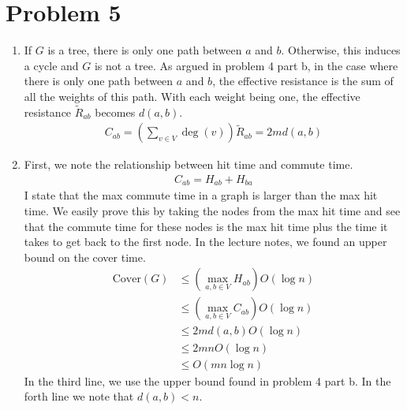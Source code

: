 \documentclass[12pt,a4paper]{article}
\begin{document}
	\section*{Problem 5}
	\begin{enumerate}[label=\alph*.]
		\item If $G$ is a tree, there is only one path between $a$ and $b$. Otherwise, this induces a cycle and $G$ is not a tree. As argued in problem 4 part b, in the case where there is only one path between $a$ and $b$, the effective resistance is the sum of all the weights of this path. With each weight being one, the effective resistance $\tilde{R}_{ab}$ becomes $d(a, b)$.
		\begin{gather*}
		C_{ab} = \left( \sum_{v \in V} \deg(v) \right) \tilde{R}_{ab} = 2 m d(a, b)
		\end{gather*}
		
		\item 
		First, we note the relationship between hit time and commute time.
		\begin{gather*}
			C_{ab} = H_{ab} + H_{ba}
		\end{gather*}
		I state that the max commute time in a graph is larger than the max hit time. We easily prove this by taking the nodes from the max hit time and see that the commute time for these nodes is the max hit time plus the time it takes to get back to the first node. In the lecture notes, we found an upper bound on the cover time.
		\begin{align*}
			\text{Cover}(G) 
			&\leq \left( \max_{a, b \in V} H_{ab} \right) O(\log n)\\
			&\leq \left( \max_{a, b \in V} C_{ab} \right) O(\log n)\\
			&\leq 2m d(a, b) O(\log n)\\
			&\leq 2m n O(\log n)\\
			&\leq O( mn \log n)
		\end{align*}
		In the third line, we use the upper bound found in problem 4 part b. In the forth line we note that $d(a, b) < n$.
	\end{enumerate}
\end{document}

